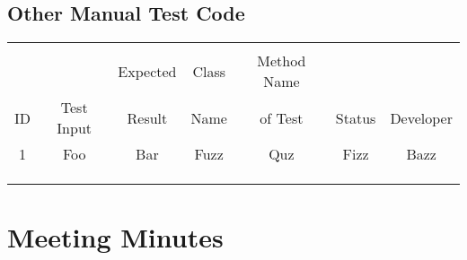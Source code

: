 \documentclass[11pt]{article}
\begin{document}
\subsection{Other Manual Test Code}
\label{sec:org2f34e6c}

\begin{center}
\begin{tabular}{|c|c|c|c|c|c|c|}
 &  &  &  &  &  & \\
 &  & Expected & Class & Method Name &  & \\
ID & Test Input & Result & Name & of Test & Status & Developer\\
\hline
1 & Foo & Bar & Fuzz & Quz & Fizz & Bazz\\
 &  &  &  &  &  & \\
 &  &  &  &  &  & \\
 &  &  &  &  &  & \\
\end{tabular}
\end{center}

\section{Meeting Minutes}
\label{sec:orgb191912}
\end{document}
